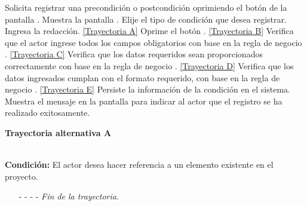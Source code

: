 	\begin{UCtrayectoria}
		\UCpaso[\UCactor] Solicita registrar una precondición o postcondición oprimiendo el botón  de la pantalla .
		\UCpaso[\UCsist] Muestra la pantalla .
		\UCpaso[\UCactor] Elije el tipo de condición que desea registrar.
		\UCpaso[\UCactor] Ingresa la redacción. \hyperlink{CU12-1-2-1:TAA}{[Trayectoria A]} \label{CU12.1.2-P3}
		\UCpaso[\UCactor] Oprime el botón . \hyperlink{CU12-1-2-1:TAB}{[Trayectoria B]} 
		\UCpaso[\UCsist] Verifica que el actor ingrese todos los campos obligatorios con base en la regla de negocio . \hyperlink{CU12-1-2-1:TAC}{[Trayectoria C]}
		\UCpaso[\UCsist] Verifica que los datos requeridos sean proporcionados correctamente con base en la regla de negocio . \hyperlink{CU12-1-2-1:TAD}{[Trayectoria D]}
		\UCpaso[\UCsist] Verifica que los datos ingresados cumplan con el formato requerido, con base en la regla de negocio . \hyperlink{CU12-1-2-1:TAE}{[Trayectoria E]}
		\UCpaso[\UCsist] Persiste la información de la condición en el sistema.
		\UCpaso[\UCsist] Muestra el mensaje  en la pantalla  para indicar al actor que el registro se ha realizado exitosamente.
	\end{UCtrayectoria}		
\hypertarget{CU12-1-2-1:TAA}{\textbf{Trayectoria alternativa A}}\\
\noindent \textbf{Condición:} El actor desea hacer referencia a un elemento existente en el proyecto.
\begin{enumerate}
	\UCpaso[\UCactor] Ingresa el token correspondiente al elemento a referenciar.
	\UCpaso[\UCsist] Verifica que los tokens utilizados se encuentren correctamente estructurados, con base en la regla de negocio . 
	\UCpaso[\UCsist] Obtiene los \hyperlink{tElemento}{elementos} registrados en el proyecto correspondientes al token ingresado. 
	\UCpaso[\UCsist] Muestra una lista con los \hyperlink{tElemento}{elementos} encontrados.
	\UCpaso[\UCactor] Selecciona un elemento de la lista.
	\UCpaso[\UCsist] Verifica que el nombre del elemento seleccionado no contenga espacios. \hyperlink{CU12-1-2-1:TAF}{[Trayectoria F]}
	\UCpaso[\UCsist] Agrega la referencia del elemento al texto. \label{CU12.1.2-TA1}
	\UCpaso Continúa en el paso \ref{CU12.1.2-P3} de la trayectoria principal.
	\item[- -] - - {\em {Fin de la trayectoria}}.%
\end{enumerate}
